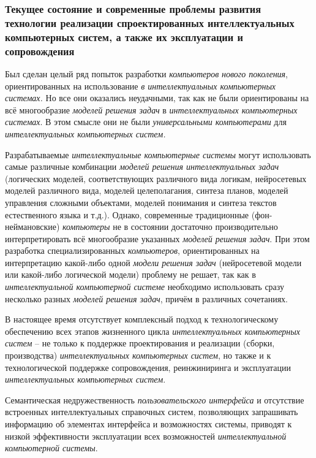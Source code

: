 \subsubsection{Текущее состояние и современные проблемы развития технологии реализации спроектированных интеллектуальных компьютерных систем, а также их эксплуатации и сопровождения}

Был сделан целый ряд попыток разработки \textit{компьютеров} \textit{нового поколения}, ориентированных на использование \textit{в интеллектуальных компьютерных системах.} Но все они оказались неудачными, так как не были ориентированы на всё многообразие \textit{моделей решения задач} в \textit{интеллектуальных компьютерных системах}. В этом смысле они не были \textit{универсальными компьютерами} для \textit{интеллектуальных компьютерных систем.}

Разрабатываемые \textit{интеллектуальные компьютерные системы} могут использовать самые различные комбинации \textit{моделей решения интеллектуальных задач} (логических моделей, соответствующих различного вида логикам, нейросетевых моделей различного вида, моделей целеполагания, синтеза планов, моделей управления сложными объектами, моделей понимания и синтеза текстов естественного языка и т.д.). Однако, современные традиционные (фон-неймановские) \textit{компьютеры} не в состоянии достаточно производительно интерпретировать всё многообразие указанных \textit{моделей решения задач}. При этом разработка специализированных \textit{компьютеров}, ориентированных на интерпретацию какой-либо одной \textit{модели решения задач} (нейросетевой модели или какой-либо логической модели) проблему не решает, так как в \textit{интеллектуальной компьютерной системе} необходимо использовать сразу несколько разных \textit{моделей решения задач}, причём в различных сочетаниях.

В настоящее время отсутствует комплексный подход к технологическому обеспечению всех этапов жизненного цикла \textit{интеллектуальных компьютерных систем} -- не только к поддержке проектирования и реализации (сборки, производства) \textit{интеллектуальных компьютерных систем}, но также и к технологической поддержке сопровождения, реинжиниринга и эксплуатации \textit{интеллектуальных компьютерных систем}.

Семантическая недружественность \textit{пользовательского интерфейса} и отсутствие встроенных интеллектуальных справочных систем, позволяющих запрашивать информацию об элементах интерфейса и возможностях системы, приводят к низкой эффективности эксплуатации всех возможностей \textit{интеллектуальной компьютерной системы}.

